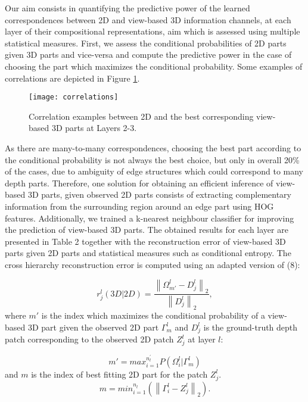 \documentclass[runningheads]{llncs}
\begin{document}
Our aim consists in quantifying the predictive power of the learned correspondences between 2D and view-based 3D information channels, at each layer of their compositional representations, aim which is assessed using multiple statistical measures. First, we assess the conditional probabilities of 2D parts given 3D parts and vice-versa and compute the predictive power in the case of choosing the part which maximizes the conditional probability. Some examples of correlations are depicted in Figure \ref{correlations}.

\begin{figure}
\begin{center}
\texttt{[image: correlations]}
\end{center}
\caption{Correlation examples between 2D and the best corresponding view-based 3D parts at Layers 2-3.}
\label{correlations}
\end{figure}

As there are many-to-many correspondences, choosing the best part according to the conditional probability is not always the best choice, but only in overall 20\% of the cases, due to ambiguity of edge structures which could correspond to many depth parts. Therefore, one solution for obtaining an efficient inference of view-based 3D parts, given observed 2D parts consists of extracting complementary information from the surrounding region around an edge part using HOG features. Additionally, we trained a k-nearest neighbour classifier for improving the prediction of view-based 3D parts. The obtained results for each layer are presented in Table 2 together with the reconstruction error of view-based 3D parts given 2D parts and statistical measures such as conditional entropy. The cross hierarchy reconstruction error is computed using an adapted version of (8):
 
\begin{equation}
 r_j^l(3D|2D) = \frac{\left\|\Omega_{m'}^l-D_j^l\right\|_2}{\left\|D_j^l\right\|_2}, 
\end{equation}
 where $m'$ is the index which maximizes the conditional probability of a view-based 3D part given the observed 2D part $\Gamma_m^l$ and $D_j^l$ is the ground-truth depth patch corresponding to the observed 2D patch $Z_j^l$ at layer $l$:
 
\begin{equation}
 m'=max_{i=1}^{n_l^{'}}P(\Omega_i^l|\Gamma_m^l)
\end{equation}
and $m$ is the index of best fitting 2D part for the patch $Z_j^l$.
\begin{equation}
 m=min_{i=1}^{n_l}(\left\|\Gamma_i^l-Z_j^l\right\|_2).
\end{equation}
\end{document}
